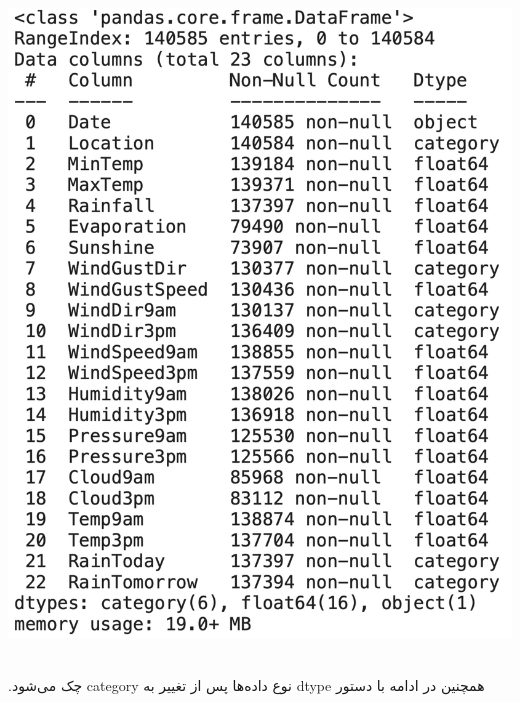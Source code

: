 ‫\begin{center}
‫\includegraphics[scale=0.35]{figs/info22.png}
‫\end{center}
‫
‫همچنین در ادامه با دستور dtype نوع داده‌ها پس از تغییر به category چک می‌شود.
‫
